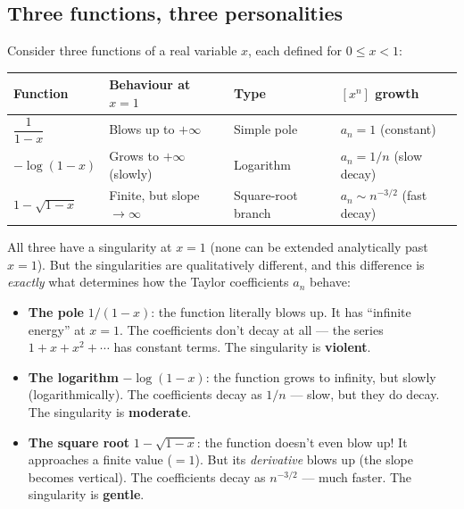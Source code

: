 \documentclass[11pt,a4paper]{article}
\theoremstyle{definition}
\begin{document}
\subsection{Three functions, three personalities}

Consider three functions of a real variable $x$, each defined for $0 \leq x < 1$:

\begin{center}
\renewcommand{\arraystretch}{1.5}
\begin{tabular}{llll}
\toprule
\textbf{Function} & \textbf{Behaviour at $x = 1$} & \textbf{Type} & $[x^n]$ \textbf{growth} \\
\midrule
$\dfrac{1}{1-x}$ & Blows up to $+\infty$ & Simple pole & $a_n = 1$ (constant) \\[6pt]
$-\log(1-x)$ & Grows to $+\infty$ (slowly) & Logarithm & $a_n = 1/n$ (slow decay) \\[6pt]
$1 - \sqrt{1-x}$ & Finite, but slope $\to \infty$ & Square-root branch & $a_n \sim n^{-3/2}$ (fast decay) \\
\bottomrule
\end{tabular}
\end{center}

All three have a singularity at $x = 1$ (none can be extended analytically past $x = 1$).
But the singularities are qualitatively different, and this difference is
\emph{exactly} what determines how the Taylor coefficients $a_n$ behave:

\begin{itemize}
\item \textbf{The pole} $1/(1-x)$: the function literally blows up. It has
      ``infinite energy'' at $x = 1$. The coefficients don't decay at all ---
      the series $1 + x + x^2 + \cdots$ has constant terms. The singularity
      is \textbf{violent}.

\item \textbf{The logarithm} $-\log(1-x)$: the function grows to infinity,
      but slowly (logarithmically). The coefficients decay as $1/n$ ---
      slow, but they do decay. The singularity is \textbf{moderate}.

\item \textbf{The square root} $1 - \sqrt{1-x}$: the function doesn't even
      blow up! It approaches a finite value ($= 1$). But its \emph{derivative}
      blows up (the slope becomes vertical). The coefficients decay
      as $n^{-3/2}$ --- much faster. The singularity is \textbf{gentle}.
\end{itemize}
\end{document}
